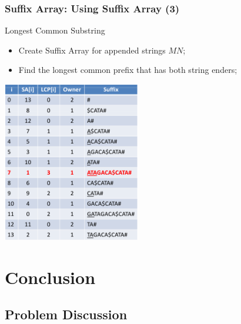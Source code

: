 \documentclass{beamer}
\begin{document}
\begin{frame}
    \frametitle{Suffix Array: Using Suffix Array (3)}
  {\smaller
    \begin{block}{Longest Common Substring}
      \begin{itemize}
      \item Create Suffix Array for appended strings $MN$;
      \item Find the longest common prefix that has both string enders;
      \end{itemize}
    \end{block}
    \begin{center}
      \includegraphics[width=0.45\textwidth]{../img/suffixarray3_halim}
    \end{center}
  }
\end{frame}

\section{Conclusion}

\subsection{Problem Discussion}


\end{document}
